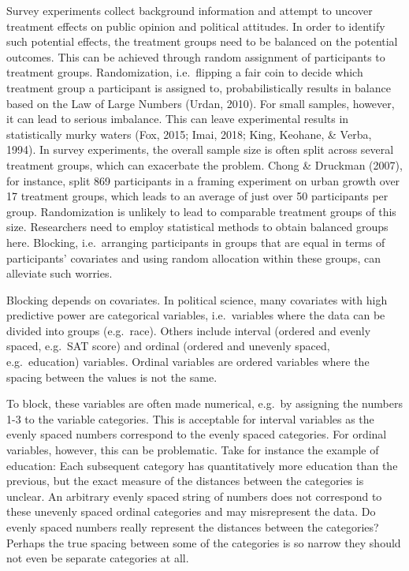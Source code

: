 \documentclass[12pt,econ]{sources/authesis}
\begin{document}
Survey experiments collect background information and attempt to uncover treatment effects on public opinion and political attitudes. In order to identify such potential effects, the treatment groups need to be balanced on the potential outcomes. This can be achieved through random assignment of participants to treatment groups. Randomization, i.e.~flipping a fair coin to decide which treatment group a participant is assigned to, probabilistically results in balance based on the Law of Large Numbers (Urdan, 2010). For small samples, however, it can lead to serious imbalance. This can leave experimental results in statistically murky waters (Fox, 2015; Imai, 2018; King, Keohane, \& Verba, 1994). In survey experiments, the overall sample size is often split across several treatment groups, which can exacerbate the problem. Chong \& Druckman (2007), for instance, split 869 participants in a framing experiment on urban growth over 17 treatment groups, which leads to an average of just over 50 participants per group. Randomization is unlikely to lead to comparable treatment groups of this size. Researchers need to employ statistical methods to obtain balanced groups here. Blocking, i.e.~arranging participants in groups that are equal in terms of participants' covariates and using random allocation within these groups, can alleviate such worries.

Blocking depends on covariates. In political science, many covariates with high predictive power are categorical variables, i.e.~variables where the data can be divided into groups (e.g.~race). Others include interval (ordered and evenly spaced, e.g.~SAT score) and ordinal (ordered and unevenly spaced, e.g.~education) variables. Ordinal variables are ordered variables where the spacing between the values is not the same.

To block, these variables are often made numerical, e.g.~by assigning the numbers 1-3 to the variable categories. This is acceptable for interval variables as the evenly spaced numbers correspond to the evenly spaced categories. For ordinal variables, however, this can be problematic. Take for instance the example of education: Each subsequent category has quantitatively more education than the previous, but the exact measure of the distances between the categories is unclear. An arbitrary evenly spaced string of numbers does not correspond to these unevenly spaced ordinal categories and may misrepresent the data. Do evenly spaced numbers really represent the distances between the categories? Perhaps the true spacing between some of the categories is so narrow they should not even be separate categories at all.
\end{document}
